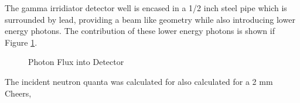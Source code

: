 \documentclass[draftcls,onecolumn]{IEEEtran}
\begin{document}
The gamma irridiator detector well is encased in a 1/2 inch steel pipe which is surrounded by lead, providing a beam like geometry while also introducing lower energy photons. 
The contribution of these lower energy photons is shown if Figure \ref{fig:PhotonFluxAllEnergies}.
\begin{figure}
  \label{fig:PhotonFluxAllEnergies}
  \caption{Photon Flux into Detector}
\end{figure}

The incident neutron quanta was calculated for also calculated for a 2 mm
Cheers,


\end{document}
